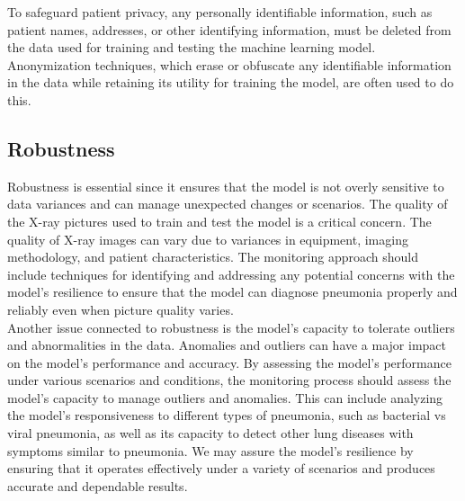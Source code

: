 To safeguard patient privacy, any personally identifiable information, such as patient names, addresses, or other identifying information, must be deleted from the data used for training and testing the machine learning model. Anonymization techniques, which erase or obfuscate any identifiable information in the data while retaining its utility for training the model, are often used to do this.\\

\subsection{Robustness}

Robustness is essential since it ensures that the model is not overly sensitive to data variances and can manage unexpected changes or scenarios. The quality of the X-ray pictures used to train and test the model is a critical concern. The quality of X-ray images can vary due to variances in equipment, imaging methodology, and patient characteristics. The monitoring approach should include techniques for identifying and addressing any potential concerns with the model's resilience to ensure that the model can diagnose pneumonia properly and reliably even when picture quality varies.\\

Another issue connected to robustness is the model's capacity to tolerate outliers and abnormalities in the data. Anomalies and outliers can have a major impact on the model's performance and accuracy. By assessing the model's performance under various scenarios and conditions, the monitoring process should assess the model's capacity to manage outliers and anomalies. This can include analyzing the model's responsiveness to different types of pneumonia, such as bacterial vs viral pneumonia, as well as its capacity to detect other lung diseases with symptoms similar to pneumonia. We may assure the model's resilience by ensuring that it operates effectively under a variety of scenarios and produces accurate and dependable results.\autocite{Firdiantika:2022}



